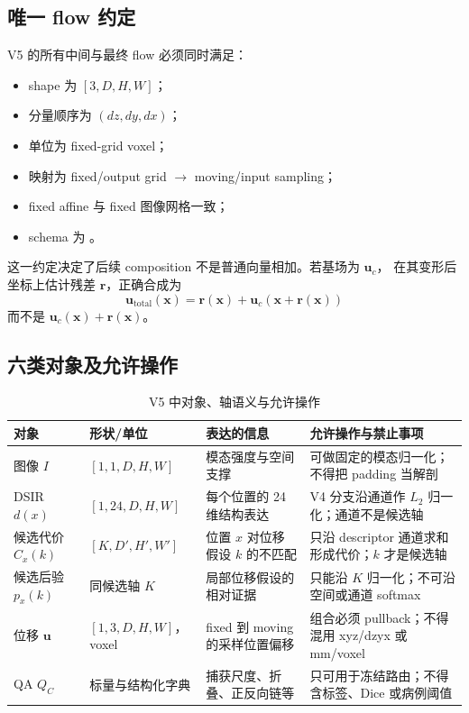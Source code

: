 \documentclass[11pt,a4paper]{ctexart}
\begin{document}
\subsection{唯一 flow 约定}
V5 的所有中间与最终 flow 必须同时满足：
\begin{itemize}
  \item shape 为 $[3,D,H,W]$；
  \item 分量顺序为 $(dz,dy,dx)$；
  \item 单位为 fixed-grid voxel；
  \item 映射为 fixed/output grid $\rightarrow$ moving/input sampling；
  \item fixed affine 与 fixed 图像网格一致；
  \item schema 为
        。
\end{itemize}
这一约定决定了后续 composition 不是普通向量相加。若基场为 $\mathbf{u}_c$，
在其变形后坐标上估计残差 $\mathbf{r}$，正确合成为
\[
\boxed{
\mathbf{u}_{\mathrm{total}}(\mathbf{x})
=\mathbf{r}(\mathbf{x})
+\mathbf{u}_c\!\left(\mathbf{x}+\mathbf{r}(\mathbf{x})\right)
}
\]
而不是 $\mathbf{u}_c(\mathbf{x})+\mathbf{r}(\mathbf{x})$。

\subsection{六类对象及允许操作}
\begin{table}[htbp]
\centering
\small
\caption{V5 中对象、轴语义与允许操作}
\begin{tabular}{p{2.4cm}p{3.2cm}p{3.8cm}p{4.3cm}}
\toprule
对象 & 形状/单位 & 表达的信息 & 允许操作与禁止事项\\
\midrule
图像 $I$ & $[1,1,D,H,W]$ & 模态强度与空间支撑 & 可做固定的模态归一化；不得把 padding 当解剖\\
DSIR $d(x)$ & $[1,24,D,H,W]$ & 每个位置的 24 维结构表达 & V4 分支沿通道作 $L_2$ 归一化；通道不是候选轴\\
候选代价 $C_x(k)$ & $[K,D',H',W']$ & 位置 $x$ 对位移假设 $k$ 的不匹配 & 只沿 descriptor 通道求和形成代价；$k$ 才是候选轴\\
候选后验 $p_x(k)$ & 同候选轴 $K$ & 局部位移假设的相对证据 & 只能沿 $K$ 归一化；不可沿空间或通道 softmax\\
位移 $\mathbf{u}$ & $[1,3,D,H,W]$，voxel & fixed 到 moving 的采样位置偏移 & 组合必须 pullback；不得混用 xyz/dzyx 或 mm/voxel\\
QA $Q_C$ & 标量与结构化字典 & 捕获尺度、折叠、正反向链等 & 只可用于冻结路由；不得含标签、Dice 或病例阈值\\
\bottomrule
\end{tabular}
\end{table}
\end{document}
